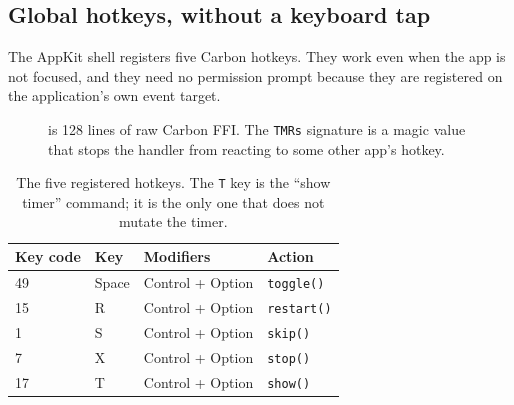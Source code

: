 \subsection{Global hotkeys, without a keyboard tap}

The AppKit shell registers five Carbon hotkeys. They work even when the app is not
focused, and they need no permission prompt because they are registered on the
application's own event target.

\begin{figure}[H]
\centering
{}
\caption{ is 128 lines of raw Carbon FFI. The \texttt{TMRs} signature
is a magic value that stops the handler from reacting to some other app's hotkey.}
\label{fig:hotkeys}
\end{figure}

\begin{table}[H]
\centering\small
\begin{tabular}{@{}p{22mm} p{26mm} p{30mm} p{60mm}@{}}
\toprule
\textbf{Key code} & \textbf{Key} & \textbf{Modifiers} & \textbf{Action} \\
\midrule
49 & Space & Control + Option & \texttt{toggle()} \\
15 & R & Control + Option & \texttt{restart()} \\
1 & S & Control + Option & \texttt{skip()} \\
7 & X & Control + Option & \texttt{stop()} \\
17 & T & Control + Option & \texttt{show()} \\
\bottomrule
\end{tabular}
\caption{The five registered hotkeys. The \texttt{T} key is the ``show timer'' command;
it is the only one that does not mutate the timer.}
\end{table}

